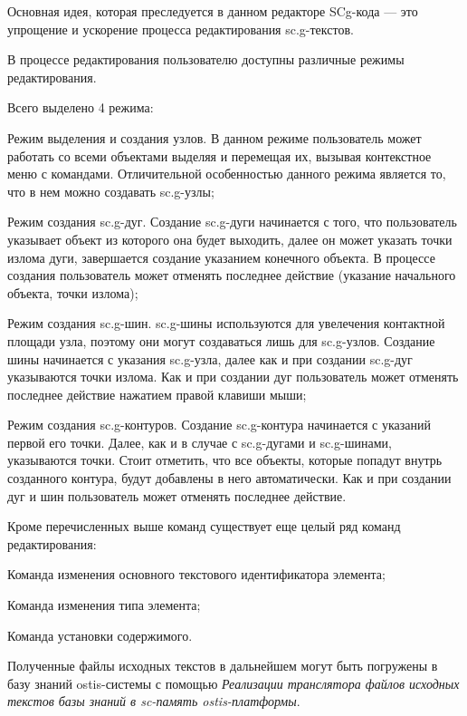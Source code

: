 Основная идея, которая преследуется в данном редакторе SCg-кода --- это упрощение и ускорение процесса редактирования sc.g-текстов.

В процессе редактирования пользователю доступны различные режимы редактирования.

Всего выделено 4 режима:
\begin{textitemize}
\item Режим выделения и создания узлов.
В данном режиме пользователь может работать со всеми объектами выделяя и перемещая их, вызывая контекстное меню с командами.
Отличительной особенностью данного режима является то, что в нем можно создавать sc.g-узлы;

\item Режим создания sc.g-дуг.
Создание sc.g-дуги начинается с того, что пользователь указывает объект из которого она будет выходить, далее он может указать точки излома дуги, завершается создание указанием конечного объекта.
В процессе создания пользователь может отменять последнее действие (указание начального объекта, точки излома);

\item Режим создания sc.g-шин.
sc.g-шины используются для увелечения контактной площади узла, поэтому они могут создаваться лишь для sc.g-узлов. 
Создание шины начинается с указания sc.g-узла, далее как и при создании sc.g-дуг указываются точки излома. 
Как и при создании дуг пользователь может отменять последнее действие нажатием правой клавиши мыши;

\item Режим создания sc.g-контуров.
Создание sc.g-контура начинается с указаний первой его точки. Далее, как и в случае с sc.g-дугами и sc.g-шинами, указываются точки.
Стоит отметить, что все объекты, которые попадут внутрь созданного
контура, будут добавлены в него автоматически.
Как и при создании дуг и шин пользователь может отменять последнее действие.
\end{textitemize}

Кроме перечисленных выше команд существует еще целый ряд команд редактирования:
\begin{textitemize}
\item Команда изменения основного текстового идентификатора элемента;
\item Команда изменения типа элемента;
\item Команда установки содержимого.
\end{textitemize}

Полученные файлы исходных текстов в дальнейшем могут быть погружены в базу знаний ostis-системы с помощью \textit{Реализации транслятора файлов исходных текстов базы знаний в sc-память ostis-платформы}.

